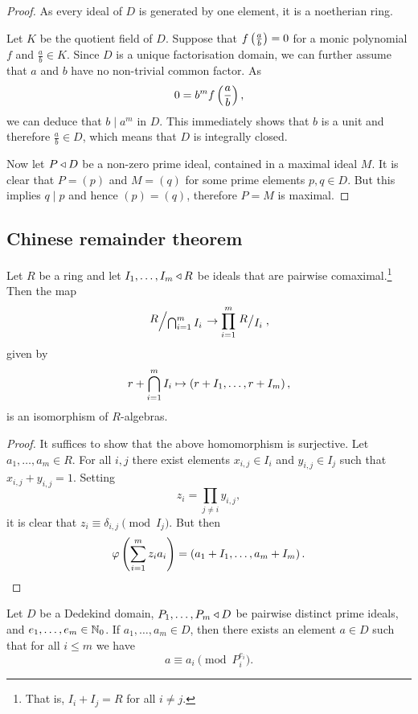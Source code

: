 \begin{proof}
As every ideal of $D$ is generated by one element, it is a
noetherian ring.

Let $K$ be the quotient field of $D$. Suppose that
$f \left(\frac{a}{b}\right) = 0$ for a monic polynomial $f$ and
$\frac{a}{b} \in K$. Since $D$ is a unique factorisation domain, we
can further assume that $a$ and $b$ have no non-trivial common
factor. As
\[
0 = b^m f \left(\frac{a}{b}\right),
\]
we can deduce that $b \mid a^m$ in $D$. This immediately shows that
$b$ is a unit and therefore $\frac{a}{b} \in D$, which means that
$D$ is integrally closed.

Now let $P \triangleleft D$ be a non-zero prime ideal, contained in a
maximal ideal $M$. It is clear that $P = (p)$ and $M = (q)$ for
some prime elements $p, q \in D$. But this implies $q \mid p$ and
hence $(p) = (q)$, therefore $P = M$ is maximal.
\end{proof}

\newpage

\subsection{Chinese remainder theorem}

\begin{izrek}
Let $R$ be a ring and let $I_1, \dots, I_m \triangleleft R$ be ideals that
are pairwise comaximal.\footnote{That is, $I_i + I_j = R$ for all
$i \ne j$.} Then the map
\[
\kvoc{R}{\bigcap_{i=1}^m I_i} \to \prod_{i=1}^m \kvoc{R}{I_i},
\]
given by
\[
r + \bigcap_{i=1}^m I_i \mapsto \left(r+I_1, \dots, r+I_m\right),
\]
is an isomorphism of $R$-algebras.
\end{izrek}

\begin{proof}
It suffices to show that the above homomorphism is surjective. Let
$a_1, \dots, a_m \in R$. For all $i, j$ there exist elements
$x_{i,j} \in I_i$ and $y_{i,j} \in I_j$ such that
$x_{i,j} + y_{i,j} = 1$. Setting
\[
z_i = \prod_{j \ne i} y_{i,j},
\]
it is clear that $z_i \equiv \delta_{i,j} \pmod{I_j}$. But then
\[
\varphi \left(\sum_{i=1}^m z_i a_i\right) =
\left(a_1 + I_1, \dots, a_m + I_m\right). \qedhere
\]
\end{proof}

\begin{posledica}
Let $D$ be a Dedekind domain, $P_1, \dots, P_m \triangleleft D$ be
pairwise distinct prime ideals, and $e_1, \dots, e_m \in \mathbb{N}_0$. If
$a_1, \dots, a_m \in D$, then there exists an element $a \in D$
such that for all $i \leq m$ we have
\[
a \equiv a_i \pmod{P_i^{e_i}}.
\]
\end{posledica}


